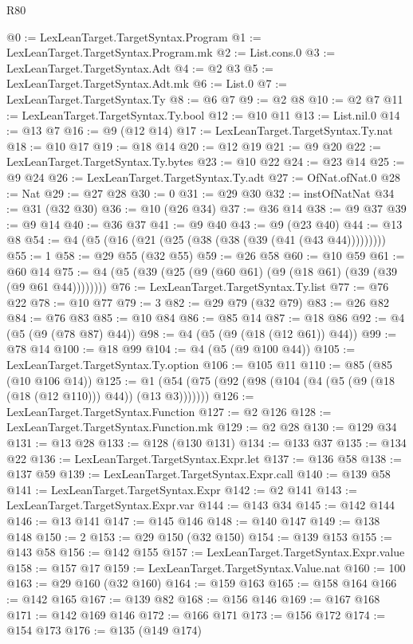 \begin{lexlean}{R80}
\begin{coremodule}
@0 := LexLeanTarget.TargetSyntax.Program
@1 := LexLeanTarget.TargetSyntax.Program.mk
@2 := List.cons.{0}
@3 := LexLeanTarget.TargetSyntax.Adt
@4 := @2 @3
@5 := LexLeanTarget.TargetSyntax.Adt.mk
@6 := List.{0}
@7 := LexLeanTarget.TargetSyntax.Ty
@8 := @6 @7
@9 := @2 @8
@10 := @2 @7
@11 := LexLeanTarget.TargetSyntax.Ty.bool
@12 := @10 @11
@13 := List.nil.{0}
@14 := @13 @7
@16 := @9 (@12 @14)
@17 := LexLeanTarget.TargetSyntax.Ty.nat
@18 := @10 @17
@19 := @18 @14
@20 := @12 @19
@21 := @9 @20
@22 := LexLeanTarget.TargetSyntax.Ty.bytes
@23 := @10 @22
@24 := @23 @14
@25 := @9 @24
@26 := LexLeanTarget.TargetSyntax.Ty.adt
@27 := OfNat.ofNat.{0}
@28 := Nat
@29 := @27 @28
@30 := 0
@31 := @29 @30
@32 := instOfNatNat
@34 := @31 (@32 @30)
@36 := @10 (@26 @34)
@37 := @36 @14
@38 := @9 @37
@39 := @9 @14
@40 := @36 @37
@41 := @9 @40
@43 := @9 (@23 @40)
@44 := @13 @8
@54 := @4 (@5 (@16 (@21 (@25 (@38 (@38 (@39 (@41 (@43 @44)))))))))
@55 := 1
@58 := @29 @55 (@32 @55)
@59 := @26 @58
@60 := @10 @59
@61 := @60 @14
@75 := @4 (@5 (@39 (@25 (@9 (@60 @61) (@9 (@18 @61) (@39 (@39 (@9 @61 @44))))))))
@76 := LexLeanTarget.TargetSyntax.Ty.list
@77 := @76 @22
@78 := @10 @77
@79 := 3
@82 := @29 @79 (@32 @79)
@83 := @26 @82
@84 := @76 @83
@85 := @10 @84
@86 := @85 @14
@87 := @18 @86
@92 := @4 (@5 (@9 (@78 @87) @44))
@98 := @4 (@5 (@9 (@18 (@12 @61)) @44))
@99 := @78 @14
@100 := @18 @99
@104 := @4 (@5 (@9 @100 @44))
@105 := LexLeanTarget.TargetSyntax.Ty.option
@106 := @105 @11
@110 := @85 (@85 (@10 @106 @14))
@125 := @1 (@54 (@75 (@92 (@98 (@104 (@4 (@5 (@9 (@18 (@18 (@12 @110))) @44)) (@13 @3)))))))
@126 := LexLeanTarget.TargetSyntax.Function
@127 := @2 @126
@128 := LexLeanTarget.TargetSyntax.Function.mk
@129 := @2 @28
@130 := @129 @34
@131 := @13 @28
@133 := @128 (@130 @131)
@134 := @133 @37
@135 := @134 @22
@136 := LexLeanTarget.TargetSyntax.Expr.let
@137 := @136 @58
@138 := @137 @59
@139 := LexLeanTarget.TargetSyntax.Expr.call
@140 := @139 @58
@141 := LexLeanTarget.TargetSyntax.Expr
@142 := @2 @141
@143 := LexLeanTarget.TargetSyntax.Expr.var
@144 := @143 @34
@145 := @142 @144
@146 := @13 @141
@147 := @145 @146
@148 := @140 @147
@149 := @138 @148
@150 := 2
@153 := @29 @150 (@32 @150)
@154 := @139 @153
@155 := @143 @58
@156 := @142 @155
@157 := LexLeanTarget.TargetSyntax.Expr.value
@158 := @157 @17
@159 := LexLeanTarget.TargetSyntax.Value.nat
@160 := 100
@163 := @29 @160 (@32 @160)
@164 := @159 @163
@165 := @158 @164
@166 := @142 @165
@167 := @139 @82
@168 := @156 @146
@169 := @167 @168
@171 := @142 @169 @146
@172 := @166 @171
@173 := @156 @172
@174 := @154 @173
@176 := @135 (@149 @174)

\end{coremodule}
\end{lexlean}
